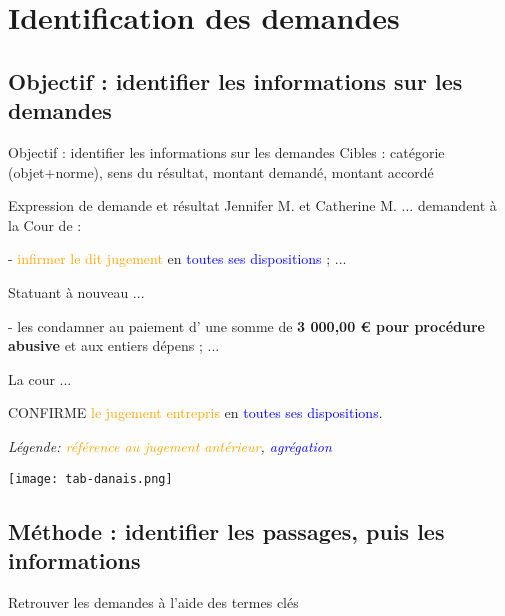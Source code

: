 \section{Identification des demandes}
\subsection{Objectif : identifier les informations sur les demandes}
\begin{frame}[c]{Objectif : identifier les informations sur les demandes}
Cibles : catégorie (objet+norme), sens du résultat, montant demandé, montant accordé
\begin{exampleblock}{Expression de demande et résultat}
	\scriptsize
	Jennifer M. et Catherine M. ... demandent à la Cour de :
	
	- \textcolor{orange}{infirmer le dit jugement} en \textcolor{blue}{toutes ses dispositions} ; 
	...
	
	Statuant à nouveau ...
	
	- les condamner au paiement d' une somme de  \textbf{3 000,00 € pour procédure abusive} et
	aux entiers dépens ; ...
	
	La cour ...  
	
	CONFIRME \textcolor{orange}{le jugement entrepris} en \textcolor{blue}{toutes ses dispositions}.
	
\end{exampleblock}

\tiny{\textit{Légende:  \textcolor{orange}{référence au jugement antérieur},  \textcolor{blue}{agrégation}}}


\begin{table} 
	\centering \texttt{[image: tab-danais.png]}
	\caption{\scriptsize Informations à extraire (dommages-intérêts pour procédure abusive)}
\end{table}
\end{frame}

\subsection{Méthode : identifier les passages, puis les informations}

\begin{frame}[c]{Retrouver les demandes à l'aide des termes clés}
\end{frame}
